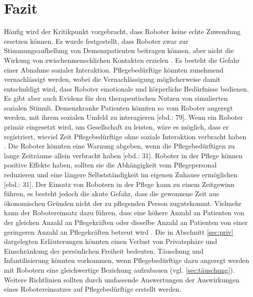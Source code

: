 \chapter{Fazit}
\label{ch:fazit}
Häufig wird der Kritikpunkt vorgebracht, dass Roboter keine echte Zuwendung ersetzen können. Es wurde festgestellt, dass Roboter zwar zur Stimmungsaufhellung von Demenzpatienten beitragen können, aber nicht die Wirkung von zwischenmenschlichen Kontakten erzielen \cite[79]{vier}. Es besteht die Gefahr einer Abnahme sozialer Interaktion. Pflegebedürftige könnten zunehmend vernachlässigt werden, wobei die Vernachlässigung möglicherweise damit entschuldigt wird, dass Roboter emotionale und körperliche Bedürfnisse bedienen. Es gibt aber auch Evidenz für den therapeutischen Nutzen von simulierten sozialen Stimuli. Demenzkranke Patienten könnten so vom Roboter angeregt werden, mit ihrem sozialen Umfeld zu interagieren [ebd.: 79]. Wenn ein Roboter primär eingesetzt wird, um Gesellschaft zu leisten, wäre es möglich, dass er registriert, wieviel Zeit Pflegebedürftige ohne soziale Interaktion verbracht haben \cite[38]{sharky}. Die Roboter könnten eine Warnung abgeben, wenn die Pflegebedürftigen zu lange Zeiträume allein verbracht haben [ebd.: 31]. Roboter in der Pflege können positive Effekte haben, sollten sie die Abhängigkeit vom Pflegepersonal reduzieren und eine längere Selbstständigkeit im eigenen Zuhause ermöglichen [ebd.: 31]. Der Einsatz von Robotern in der Pflege kann zu einem Zeitgewinn führen, es besteht jedoch die akute Gefahr, dass die gewonnene Zeit aus ökonomischen Gründen nicht der zu pflegenden Person zugutekommt. Vielmehr kann der Robotereinsatz dazu führen, dass eine höhere Anzahl an Patienten von der gleichen Anzahl an Pflegekräften oder dieselbe Anzahl an Patienten von einer geringeren Anzahl an Pflegekräften betreut wird \cite[143]{sparrow}. Die in Abschnitt \ref{sec:priv} dargelegten Erläuterungen könnten einen Verlust von Privatsphäre und Einschränkung der persönlichen Freiheit bedeuten. Täuschung und Infantilisierung könnten vorkommen, wenn Pflegebedürftige dazu angeregt werden mit Robotern eine gleichwertige Beziehung aufzubauen (vgl. \ref{sec:täuschung}). Weitere Richtlinien sollten durch umfassende Auswertungen der Auswirkungen eines Robotereinsatzes auf Pflegebedürftige erstellt werden.




